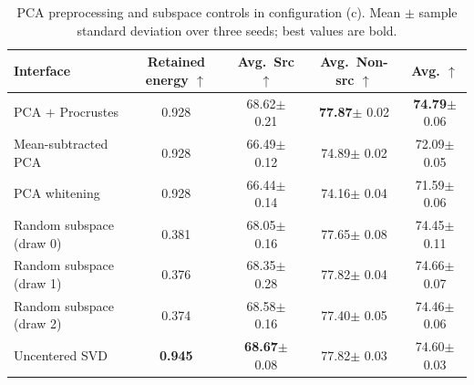 \begin{table}[!htbp]
  \centering
  \caption{PCA preprocessing and subspace controls in configuration (c).
    Mean $\pm$ sample standard deviation over three seeds; best values are bold.}
  \label{tab:pca-preprocessing}
  \small
  \newcommand{\pcell}[2]{#1{\tiny $\pm$ #2}}
  \setlength{\tabcolsep}{4.5pt}
  \begin{tabular}{@{}lcccc@{}}
    \toprule
    Interface & Retained energy $\uparrow$ & Avg.~Src $\uparrow$
    & Avg.~Non-src $\uparrow$ & Avg. $\uparrow$ \\
    \midrule
    PCA $+$ Procrustes
      & 0.928 & \pcell{68.62}{0.21} & \pcell{\textbf{77.87}}{0.02}
      & \pcell{\textbf{74.79}}{0.06} \\
    Mean-subtracted PCA
      & 0.928 & \pcell{66.49}{0.12} & \pcell{74.89}{0.02} & \pcell{72.09}{0.05} \\
    PCA whitening
      & 0.928 & \pcell{66.44}{0.14} & \pcell{74.16}{0.04}
      & \pcell{71.59}{0.06} \\
    Random subspace (draw 0)
      & 0.381 & \pcell{68.05}{0.16} & \pcell{77.65}{0.08} & \pcell{74.45}{0.11} \\
    Random subspace (draw 1)
      & 0.376 & \pcell{68.35}{0.28} & \pcell{77.82}{0.04} & \pcell{74.66}{0.07} \\
    Random subspace (draw 2)
      & 0.374 & \pcell{68.58}{0.16} & \pcell{77.40}{0.05} & \pcell{74.46}{0.06} \\
    Uncentered SVD
      & \textbf{0.945} & \pcell{\textbf{68.67}}{0.08}
      & \pcell{{77.82}}{0.03} & \pcell{{74.60}}{0.03} \\
    \bottomrule
  \end{tabular}
\end{table}
